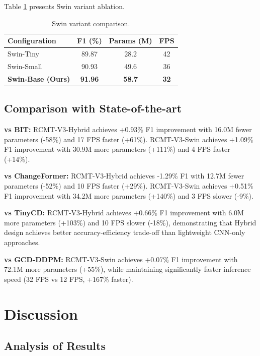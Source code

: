 \documentclass[journal]{IEEEtran}
\begin{document}
{Table \ref{tab:swin_variants} presents Swin variant ablation.

\begin{table}[ht]
\centering
\caption{Swin variant comparison.}
\label{tab:swin_variants}
\begin{tabular}{lccc}
\toprule
\textbf{Configuration} & \textbf{F1 (\%)} & \textbf{Params (M)} & \textbf{FPS} \\
\midrule
    Swin-Tiny & 89.87 & 28.2 & 42 \\
    Swin-Small & 90.93 & 49.6 & 36 \\
    \textbf{Swin-Base (Ours)} & \textbf{91.96} & \textbf{58.7} & \textbf{32} \\
\bottomrule
\end{tabular}
\end{table}

\subsection{Comparison with State-of-the-art}

\textbf{vs BIT:} RCMT-V3-Hybrid achieves +0.93\% F1 improvement with 16.0M fewer parameters (-58\%) and 17 FPS faster (+61\%). RCMT-V3-Swin achieves +1.09\% F1 improvement with 30.9M more parameters (+111\%) and 4 FPS faster (+14\%).

\textbf{vs ChangeFormer:} RCMT-V3-Hybrid achieves -1.29\% F1 with 12.7M fewer parameters (-52\%) and 10 FPS faster (+29\%). RCMT-V3-Swin achieves +0.51\% F1 improvement with 34.2M more parameters (+140\%) and 3 FPS slower (-9\%).

\textbf{vs TinyCD:} RCMT-V3-Hybrid achieves +0.66\% F1 improvement with 6.0M more parameters (+103\%) and 10 FPS slower (-18\%), demonstrating that Hybrid design achieves better accuracy-efficiency trade-off than lightweight CNN-only approaches.

\textbf{vs GCD-DDPM:} RCMT-V3-Swin achieves +0.07\% F1 improvement with 72.1M more parameters (+55\%), while maintaining significantly faster inference speed (32 FPS vs 12 FPS, +167\% faster).

\section{Discussion}

\subsection{Analysis of Results}

}
\end{document}
